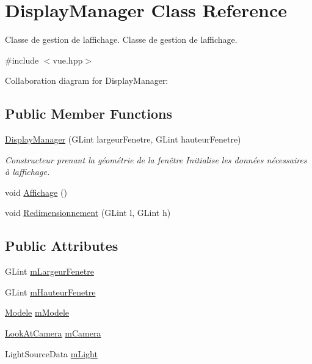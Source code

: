 \hypertarget{class_display_manager}{}\section{Display\+Manager Class Reference}
\label{class_display_manager}


Classe de gestion de l\textquotesingle{}affichage. Classe de gestion de l\textquotesingle{}affichage.  




{\ttfamily \#include $<$vue.\+hpp$>$}



Collaboration diagram for Display\+Manager\+:
\subsection*{Public Member Functions}
\begin{DoxyCompactItemize}
\item 
\hyperlink{class_display_manager_abf11523503126b8ee8ed26d79aba9974}{Display\+Manager} (G\+Lint largeur\+Fenetre, G\+Lint hauteur\+Fenetre)
\begin{DoxyCompactList}\small\item\em Constructeur prenant la géométrie de la fenêtre Initialise les données nécessaires à l\textquotesingle{}affichage. \end{DoxyCompactList}\item 
void \hyperlink{class_display_manager_a692eb24cc56a7ab15ab1fd5a88646a34}{Affichage} ()
\item 
void \hyperlink{class_display_manager_a5372587f56171ad81ac7c0ef686c61f4}{Redimensionnement} (G\+Lint l, G\+Lint h)
\end{DoxyCompactItemize}
\subsection*{Public Attributes}
\begin{DoxyCompactItemize}
\item 
G\+Lint \hyperlink{class_display_manager_a7078a2a1023ebe660ce2e3007a988a62}{m\+Largeur\+Fenetre}
\item 
G\+Lint \hyperlink{class_display_manager_a73b96e4ef8a0621077bcc83bc1dba2cf}{m\+Hauteur\+Fenetre}
\item 
\hyperlink{class_modele}{Modele} \hyperlink{class_display_manager_a0c8ba3fe8aece87fc924847fc8958398}{m\+Modele}
\item 
\hyperlink{class_look_at_camera}{Look\+At\+Camera} \hyperlink{class_display_manager_a17dd81e3974b51416a35c7e9d9232a60}{m\+Camera}
\item 
Light\+Source\+Data \hyperlink{class_display_manager_a012e14f7761f19a3d049aae93f5d694b}{m\+Light}
\end{DoxyCompactItemize}


